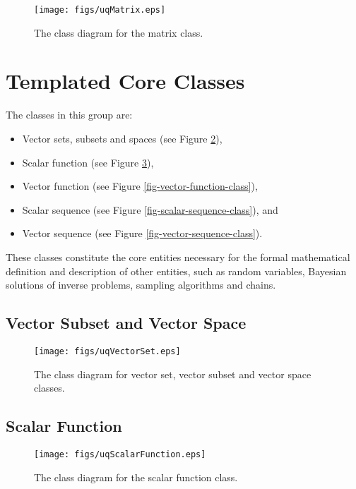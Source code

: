 \begin{figure}[h!]
\centerline{
\texttt{[image: figs/uqMatrix.eps]}
}
\caption{
The class diagram for the matrix class.
}
\label{fig-matrix-class}
\end{figure}

\clearpage
\section{Templated Core Classes}

The classes in this group are:
\begin{itemize}
\item Vector sets, subsets and spaces (see Figure \ref{fig-vector-space-subset-classes}),
\item Scalar function (see Figure \ref{fig-scalar-function-class}),
\item Vector function (see Figure \ref{fig-vector-function-class}),
\item Scalar sequence (see Figure \ref{fig-scalar-sequence-class}), and
\item Vector sequence (see Figure \ref{fig-vector-sequence-class}).
\end{itemize}
These classes constitute the core entities necessary for the formal
mathematical definition and description of other entities, such as
random variables, Bayesian solutions of inverse problems, sampling algorithms and chains.

\clearpage
\subsection{Vector Subset and Vector Space}

\begin{figure}[h!]
\centerline{
\texttt{[image: figs/uqVectorSet.eps]}
}
\caption{
The class diagram for vector set, vector subset and vector space classes.
}
\label{fig-vector-space-subset-classes}
\end{figure}

\clearpage
\subsection{Scalar Function}

\begin{figure}[h!]
\centerline{
\texttt{[image: figs/uqScalarFunction.eps]}
}
\caption{
The class diagram for the scalar function class.
}
\label{fig-scalar-function-class}
\end{figure}

